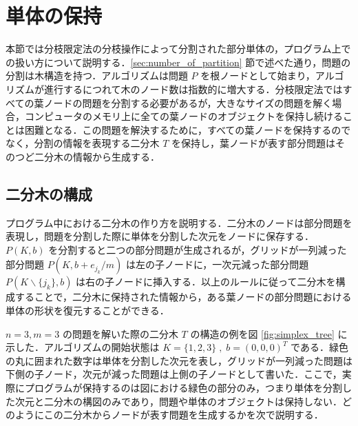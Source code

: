 \documentclass[a4paper,11pt]{jreport}
\begin{document}
\section{単体の保持}

本節では分枝限定法の分枝操作によって分割された部分単体の，プログラム上での扱い方について説明する．\ref{sec:number_of_partition} 節で述べた通り，問題の分割は木構造を持つ．アルゴリズムは問題 $ P $ を根ノードとして始まり，アルゴリズムが進行するにつれて木のノード数は指数的に増大する．分枝限定法ではすべての葉ノードの問題を分割する必要があるが，大きなサイズの問題を解く場合，コンピュータのメモリ上に全ての葉ノードのオブジェクトを保持し続けることは困難となる．この問題を解決するために，すべての葉ノードを保持するのでなく，分割の情報を表現する二分木 $ T $ を保持し，葉ノードが表す部分問題はそのつど二分木の情報から生成する．\par

\subsection{二分木の構成}

プログラム中における二分木の作り方を説明する．二分木のノードは部分問題を表現し，問題を分割した際に単体を分割した次元をノードに保存する．$ P(K, b) $ を分割すると二つの部分問題が生成されるが，グリッドが一列減った部分問題 $ P(K, b + e_{j_k} / m) $ は左の子ノードに，一次元減った部分問題 $ P(K \backslash \{ j_k \}, b) $ は右の子ノードに挿入する．以上のルールに従って二分木を構成することで，二分木に保持された情報から，ある葉ノードの部分問題における単体の形状を復元することができる．\par
$ n = 3, m = 3 $ の問題を解いた際の二分木 $ T $ の構造の例を図 \ref{fig:simplex_tree} に示した．アルゴリズムの開始状態は $ K = \{1, 2, 3\} \; , \; b = (0, 0, 0)^T $ である．緑色の丸に囲まれた数字は単体を分割した次元を表し，グリッドが一列減った問題は下側の子ノード，次元が減った問題は上側の子ノードとして書いた．ここで，実際にプログラムが保持するのは図における緑色の部分のみ，つまり単体を分割した次元と二分木の構図のみであり，問題や単体のオブジェクトは保持しない．どのようにこの二分木からノードが表す問題を生成するかを次で説明する．\par
\end{document}
